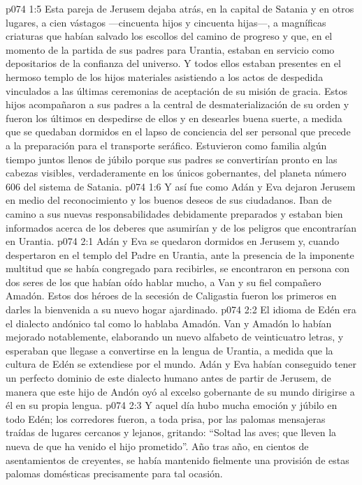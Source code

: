 \vs p074 1:5 \pc Esta pareja de Jerusem dejaba atrás, en la capital de Satania y en otros lugares, a cien vástagos ---cincuenta hijos y cincuenta hijas---, a magníficas criaturas que habían salvado los escollos del camino de progreso y que, en el momento de la partida de sus padres para Urantia, estaban en servicio como depositarios de la confianza del universo. Y todos ellos estaban presentes en el hermoso templo de los hijos materiales asistiendo a los actos de despedida vinculados a las últimas ceremonias de aceptación de su misión de gracia. Estos hijos acompañaron a sus padres a la central de desmaterialización de su orden y fueron los últimos en despedirse de ellos y en desearles buena suerte, a medida que se quedaban dormidos en el lapso de conciencia del ser personal que precede a la preparación para el transporte seráfico. Estuvieron como familia algún tiempo juntos llenos de júbilo porque sus padres se convertirían pronto en las cabezas visibles, verdaderamente en los únicos gobernantes, del planeta número 606 del sistema de Satania.
\vs p074 1:6 Y así fue como Adán y Eva dejaron Jerusem en medio del reconocimiento y los buenos deseos de sus ciudadanos. Iban de camino a sus nuevas responsabilidades debidamente preparados y estaban bien informados acerca de los deberes que asumirían y de los peligros que encontrarían en Urantia.
\vs p074 2:1 Adán y Eva se quedaron dormidos en Jerusem y, cuando despertaron en el templo del Padre en Urantia, ante la presencia de la imponente multitud que se había congregado para recibirles, se encontraron en persona con dos seres de los que habían oído hablar mucho, a Van y su fiel compañero Amadón. Estos dos héroes de la secesión de Caligastia fueron los primeros en darles la bienvenida a su nuevo hogar ajardinado.
\vs p074 2:2 El idioma de Edén era el dialecto andónico tal como lo hablaba Amadón. Van y Amadón lo habían mejorado notablemente, elaborando un nuevo alfabeto de veinticuatro letras, y esperaban que llegase a convertirse en la lengua de Urantia, a medida que la cultura de Edén se extendiese por el mundo. Adán y Eva habían conseguido tener un perfecto dominio de este dialecto humano antes de partir de Jerusem, de manera que este hijo de Andón oyó al excelso gobernante de su mundo dirigirse a él en su propia lengua.
\vs p074 2:3 Y aquel día hubo mucha emoción y júbilo en todo Edén; los corredores fueron, a toda prisa, por las palomas mensajeras traídas de lugares cercanos y lejanos, gritando: “Soltad las aves; que lleven la nueva de que ha venido el hijo prometido”. Año tras año, en cientos de asentamientos de creyentes, se había mantenido fielmente una provisión de estas palomas domésticas precisamente para tal ocasión.

